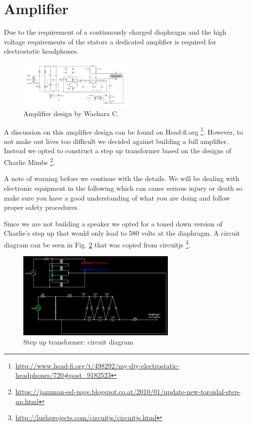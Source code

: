 \documentclass{article}
\begin{document}
\section{Amplifier}
\label{s:amp}
Due to the requirement of a continuously charged diaphragm and the high voltage requirements of the stators a dedicated amplifier is required for electrostatic headphones.
\begin{figure}[htb]
    \centering
    \includegraphics[width=0.5\textwidth]{images/wachara-amp.png}
    \caption{Amplifier design by Wachara C.}
    \label{f:amp:wachara}
\end{figure}
A discussion on this amplifier design can be found on Head-fi.org \footnote{\url{http://www.head-fi.org/t/498292/my-diy-electrostatic-headphones/720#post_9182523}}. However, to not make out lives too difficult we decided against building a full amplifier. Instead we opted to construct a step up transformer based on the designs of Charlie Mimbs \footnote{\url{https://jazzman-esl-page.blogspot.co.at/2010/01/update-new-toroidal-step-up.html}}.

A note of warning before we continue with the details. We will be dealing with electronic equipment in the following which can cause serious injury or death so make sure you have a good understanding of what you are doing and follow proper safety procedures.

Since we are not building a speaker we opted for a toned down version of Charlie's step up that would only lead to 580 volts at the diaphragm. A circuit diagram can be seen in Fig. \ref{f:amp:step-up} that was copied from circuitjs \footnote{\url{http://lushprojects.com/circuitjs/circuitjs.html}}.

\begin{figure}[htb]
    \centering
    \includegraphics[width=0.7\textwidth]{images/step-up-transformer.png}
    \caption{Step up transformer: circuit diagram}
    \label{f:amp:step-up}
\end{figure}
\end{document}
